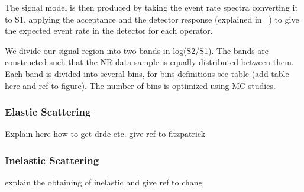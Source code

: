 The signal model is then produced by taking the event rate spectra converting it to S1, applying the acceptance and the detector response (explained in ~\cite{xe100_ana2012}) to give the expected event rate in the detector for each operator. 

We divide our signal region into two bands in log(S2/S1). The bands are constructed such that the NR data sample is equally distributed between them. Each band is divided into several bins, for bins definitions see table (add table here and ref to figure). The number of bins is optimized using MC studies.



\subsubsection{Elastic Scattering}
\label{subsubsec:Elastic}
Explain here how to get drde etc. give ref to fitzpatrick
\subsubsection{Inelastic Scattering}
\label{subsubsec:Inelastic}
explain the obtaining of inelastic and give ref to chang